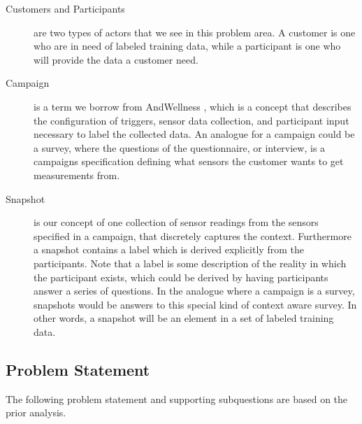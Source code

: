 \begin{description}
    \item [Customers and Participants] are two types of actors that we see in this problem area. A customer is one who are in need of labeled training data, while a participant is one who will provide the data a customer need. 
\end{description}

\begin{description}
    \item[Campaign] is a term we borrow from AndWellness \parencite{hicks2010andwellness}, which is a concept that describes the configuration of triggers, sensor data collection, and participant input necessary to label the collected data. An analogue for a campaign could be a survey, where the questions of the questionnaire, or interview, is a campaigns specification defining what sensors the customer wants to get measurements from. 
\end{description}

\begin{description}
    \item[Snapshot] is our concept of one collection of sensor readings from the sensors specified in a campaign, that discretely captures the context. Furthermore a snapshot contains a label which is derived explicitly from the participants. Note that a label is some description of the reality in which the participant exists, which could be derived by having participants answer a series of questions. In the analogue where a campaign is a survey, snapshots would be answers to this special kind of context aware survey. In other words, a snapshot will be an element in a set of labeled training data.
\end{description}

\subsection{Problem Statement}
\label{sub:problem_statement}
The following problem statement and supporting subquestions are based on the prior analysis.
\\


